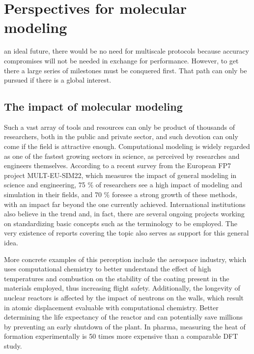 \chapter{Perspectives for molecular modeling}
\label{chap:appendix-a}

 an ideal future, there would be no need for multiscale protocols because accuracy compromises will not be needed in exchange for performance. However, to get there a large series of milestones must be conquered first. That path can only be pursued if there is a global interest.

\section*{The impact of molecular modeling}
\label{molecular-modeling-impact}

Such a vast array of tools and resources can only be product of thousands of researchers, both in the public and private sector, and such devotion can only come if the field is attractive enough. Computational modeling is widely regarded as one of the fastest growing sectors in science, as perceived by researches and engineers themselves. According to a recent survey from the European FP7 project MULT-EU-SIM22, which measures the impact of general modeling in science and engineering, 75 $\%$  of researchers see a high impact of modeling and simulation in their fields, and 70 $\%$  foresee a strong growth of these methods, with an impact far beyond the one currently achieved.\cite{ENN2012} International institutions also believe in the trend and, in fact, there are several ongoing projects working on standardizing basic concepts such as the terminology to be employed.\cite{cen2017} The very existence of reports covering the topic\cite{Goldbeck2012,Goldbeck2016,goldbeck2017} also serves as support for this general idea.

More concrete examples of this perception include the aerospace industry, which uses computational chemistry to better understand the effect of high temperatures and combustion on the stability of the coating present in the materials employed, thus increasing flight safety. Additionally, the longevity of nuclear reactors is affected by the impact of neutrons on the walls, which result in atomic displacement evaluable with computational chemistry. Better determining the life expectancy of the reactor and can potentially save millions by preventing an early shutdown of the plant.\cite{UKeconomics} In pharma, measuring the heat of formation experimentally is 50 times more expensive than a comparable DFT study.\cite{maginn2009}

